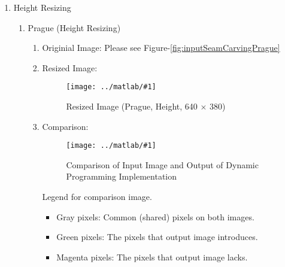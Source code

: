 \documentclass{article}
\newcommand{\listFigure}[3]{
	\begin{figure}[H]
		\texttt{[image: ../matlab/\#1]}
		\caption{#2\label{fig:#3}}
	\end{figure}		
}
\begin{document}
\begin{enumerate}
\begin{enumerate}
		\pagebreak
		\item Mall (Width Resizing)\\
		\begin{enumerate}
			\item Originial Image: \\
			\listFigure{inputSeamCarvingMall.jpg}{Input Image (Mall, 775 $\times$
			769)}{inputSeamCarvingMall}
			\pagebreak
			\item Resized Image: \\
			\listFigure{outputReduceWidthMall.png}{Resized Image (Mall, Width, 675
			$\times$ 769)}{outputReduceWidthMall}
			\pagebreak
			\item Comparison: \\
			\listFigure{outputReduceWidthInputvsDynamicMall.png}{Comparison
			Image}{outputReduceWidthInputvsDynamicMall}
			Legend for comparison image.
			\begin{itemize}
				\item Gray pixels: Common (shared) pixels on both images.
				\item Green pixels: The pixels that output image introduces.
				\item Magenta pixels: The pixels that output image lacks.
			\end{itemize}
		\end{enumerate}
		\pagebreak
		\item Script: SeamCarvingReduceWidth.m
		
	\end{enumerate}
	\pagebreak
	
	\item Height Resizing \\
		\begin{enumerate} 
		\item Prague (Height Resizing) \\
		\begin{enumerate}
			\item Originial Image: Please see Figure-\ref{fig:inputSeamCarvingPrague} \\
			\item Resized Image: \\
			\listFigure{outputReduceWidthPrague}{Resized Image (Prague, Height, 640
			$\times$ 380)}{outputReduceHeightPrague}
			\pagebreak
			\item Comparison: \\
			\listFigure{outputReduceHeightInputvsDynamicPrague.png}{Comparison of Input Image and Output of Dynamic Programming
				Implementation}{outputReduceHeightInputvsDynamicPrague}
			Legend for comparison image.
			\begin{itemize}
				\item Gray pixels: Common (shared) pixels on both images.
				\item Green pixels: The pixels that output image introduces.
				\item Magenta pixels: The pixels that output image lacks.
			\end{itemize}
		\end{enumerate}
		\pagebreak
		

\end{enumerate}
\end{enumerate}
\end{document}
